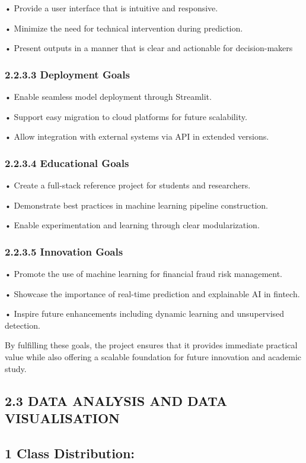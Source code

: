 \documentclass[11pt,a4paper]{article}
\begin{document}
• 
Provide a user interface that is intuitive and responsive. 

• 
Minimize the need for technical intervention during prediction. 

• 
Present outputs in a manner that is clear and actionable for decision-makers 

\subsubsection*{2.2.3.3 Deployment Goals }

• 
Enable seamless model deployment through Streamlit. 

• 
Support easy migration to cloud platforms for future scalability. 

• 
Allow integration with external systems via API in extended versions. 

\subsubsection*{2.2.3.4 Educational Goals }

• 
Create a full-stack reference project for students and researchers. 

• 
Demonstrate best practices in machine learning pipeline construction. 

• 
Enable experimentation and learning through clear modularization. 

\subsubsection*{2.2.3.5 Innovation Goals }

• 
Promote the use of machine learning for financial fraud risk management. 

• 
Showcase the importance of real-time prediction and explainable AI in fintech. 

• 
Inspire future enhancements including dynamic learning and unsupervised detection. 

By fulfilling these goals, the project ensures that it provides immediate practical value while also offering a 
scalable foundation for future innovation and academic study. 

\subsection*{2.3 DATA ANALYSIS AND DATA VISUALISATION }

\subsection*{1 Class Distribution: }
\end{document}
